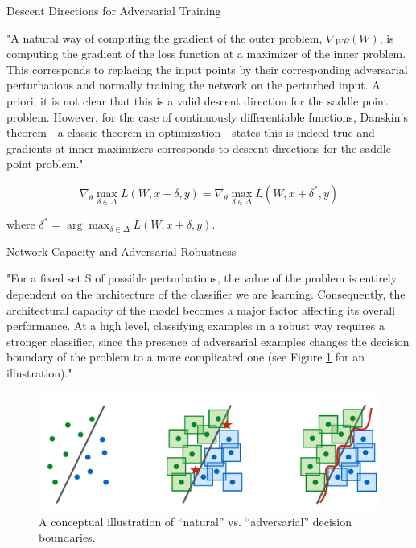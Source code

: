 \documentclass[english]{article}
\begin{document}
\item Descent Directions for Adversarial Training

"A natural way of computing the gradient of the outer problem,
$\nabla_W \rho(W)$, is computing the gradient of the loss function at a maximizer of the inner problem. This
corresponds to replacing the input points by their corresponding adversarial perturbations and
normally training the network on the perturbed input. A priori, it is not clear that this is a valid
descent direction for the saddle point problem. However, for the case of continuously differentiable
functions, Danskin's theorem - a classic theorem in optimization - states this is indeed true and
gradients at inner maximizers corresponds to descent directions for the saddle point problem."


$$\nabla_\theta \max_{\delta\in \Delta}
L(W,x+\delta,y)
= 
\nabla_\theta \max_{\delta\in \Delta}
L(W,x+\delta^*,y)
$$

where $\delta^* = \arg\max_{\delta\in \Delta}
L(W,x+\delta,y)$.

\item Network Capacity and Adversarial Robustness

"For a fixed set S of possible perturbations, the value of the problem is entirely dependent on the
architecture of the classifier we are learning. Consequently, the architectural capacity of the model
becomes a major factor affecting its overall performance. At a high level, classifying examples in
a robust way requires a stronger classifier, since the presence of adversarial examples changes the
decision boundary of the problem to a more complicated one (see Figure \ref{natl_adv} for an illustration)."

  \begin{figure}
        \centering
        \includegraphics[scale = 0.35]{natl_adv.PNG}
        
        \caption{A conceptual illustration of “natural” vs. “adversarial” decision boundaries.}
        \label{natl_adv}
    \end{figure}
\end{document}
